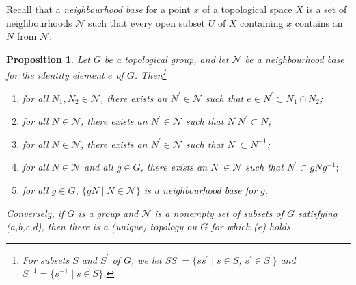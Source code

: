 \documentclass[a4paper,11pt,final,openany]{memoir}
\newtheorem{proposition}[X]{Proposition}
\theoremstyle{nonumberplain}
\begin{document}
Recall that a%
\emph{neighbourhood base} for a point $x$ of a topological space $X$ is a set
of neighbourhoods $\mathcal{N}$ such that every open subset $U$ of $X$
containing $x$ contains an $N$ from $\mathcal{N}{}$.

\begin{proposition}
\label{ig2}Let $G$ be a topological group, and let $\mathcal{N}{}$ be a
neighbourhood base for the identity element $e$ of $G$. Then\footnote{For
subsets $S$ and $S^{\prime}$ of $G$, we let $SS^{\prime}=\{ss^{\prime}\mid
s\in S$, $s^{\prime}\in S^{\prime}\}$ and $S^{-1}=\{s^{-1}\mid s\in S\}$.}

\begin{enumerate}
\item for all $N_{1},N_{2}\in\mathcal{N}{}$, there exists an $N^{\prime}%
\in\mathcal{N}{}$ such that $e\in N^{\prime}\subset N_{1}\cap N_{2}$;

\item for all $N\in\mathcal{N}{}$, there exists an $N^{\prime}\in\mathcal{N}%
{}$ such that $N^{\prime}N^{\prime}\subset N$;

\item for all $N\in\mathcal{N}{}$, there exists an $N^{\prime}\in\mathcal{N}%
{}$ such that $N^{\prime}\subset N^{-1}$;

\item for all $N\in\mathcal{N}{}$ and all $g\in G$, there exists an
$N^{\prime}\in\mathcal{N}{}$ such that $N^{\prime}\subset gNg^{-1};$

\item for all $g\in G$, $\{gN\mid N\in\mathcal{N}{}\}$ is a neighbourhood base
for $g$.
\end{enumerate}

\noindent Conversely, if $G$ is a group and $\mathcal{N}{}$ is a nonempty set
of subsets of $G$ satisfying (a,b,c,d), then there is a (unique) topology on
$G$ for which (e) holds.
\end{proposition}
\end{document}
